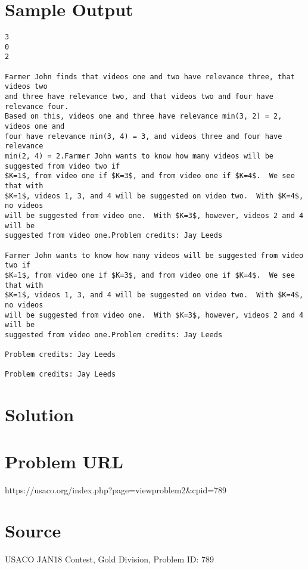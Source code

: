 \documentclass[12pt]{article}
\begin{document}
\section*{Sample Output}
\begin{verbatim}
3
0
2

Farmer John finds that videos one and two have relevance three, that videos two
and three have relevance two, and that videos two and four have relevance four. 
Based on this, videos one and three have relevance min(3, 2) = 2, videos one and
four have relevance min(3, 4) = 3, and videos three and four have relevance
min(2, 4) = 2.Farmer John wants to know how many videos will be suggested from video two if
$K=1$, from video one if $K=3$, and from video one if $K=4$.  We see that with
$K=1$, videos 1, 3, and 4 will be suggested on video two.  With $K=4$, no videos
will be suggested from video one.  With $K=3$, however, videos 2 and 4 will be
suggested from video one.Problem credits: Jay Leeds

Farmer John wants to know how many videos will be suggested from video two if
$K=1$, from video one if $K=3$, and from video one if $K=4$.  We see that with
$K=1$, videos 1, 3, and 4 will be suggested on video two.  With $K=4$, no videos
will be suggested from video one.  With $K=3$, however, videos 2 and 4 will be
suggested from video one.Problem credits: Jay Leeds

Problem credits: Jay Leeds

Problem credits: Jay Leeds
\end{verbatim}

\section*{Solution}


\section*{Problem URL}
https://usaco.org/index.php?page=viewproblem2&cpid=789

\section*{Source}
USACO JAN18 Contest, Gold Division, Problem ID: 789
\end{document}
